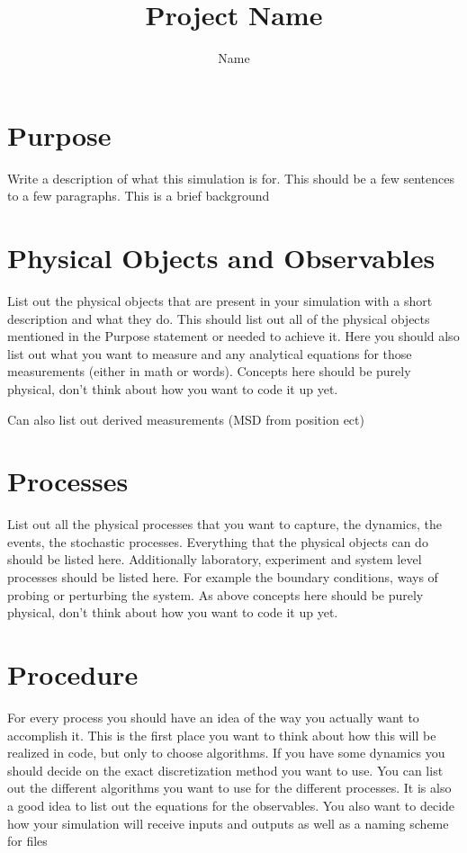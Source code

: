 \documentclass[]{scrartcl}
\title{Project Name}
\author{Name}
\begin{document}
\maketitle

\section{Purpose}
Write a description of what this simulation is for. This should be a few sentences to a few paragraphs. This is a brief background 
\section{Physical Objects and Observables}
List out the physical objects that are present in your simulation with a short description and what they do. This should list out all of the physical objects mentioned in the Purpose statement or needed to achieve it. Here you should also list out what you want to measure and any analytical equations for those measurements (either in math or words). Concepts here should be purely physical, don’t think about how you want to code it up yet. 

Can also list out derived measurements (MSD from position ect)

\section{Processes}
List out all the physical processes that you want to capture, the dynamics, the events, the stochastic processes. Everything that the physical objects can do should be listed here. Additionally laboratory, experiment and system level processes should be listed here. For example the boundary conditions, ways of probing or perturbing the system. As above concepts here should be purely physical, don’t think about how you want to code it up yet. 

\section{Procedure}
For every process you should have an idea of the way you actually want to accomplish it. This is the first place you want to think about how this will be realized in code, but only to choose algorithms. If you have some dynamics you should decide on the exact discretization method you want to use. You can list out the different algorithms you want to use for the different processes. It is also a good idea to list out the equations for the observables. You also want to decide how your simulation will receive inputs and outputs as well as a naming scheme for files
\end{document}
